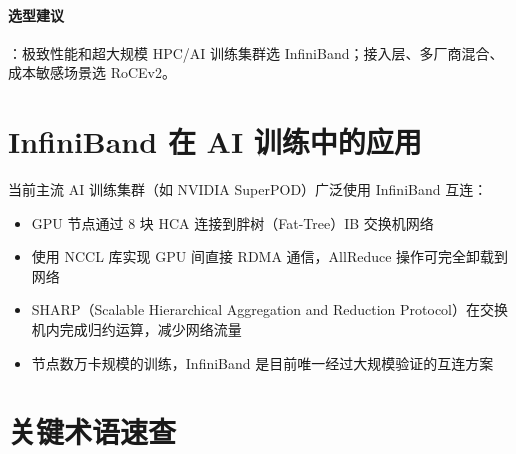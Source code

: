 \paragraph{选型建议}：极致性能和超大规模 HPC/AI 训练集群选 InfiniBand；接入层、多厂商混合、成本敏感场景选 RoCEv2。

\section{InfiniBand 在 AI 训练中的应用}

当前主流 AI 训练集群（如 NVIDIA SuperPOD）广泛使用 InfiniBand 互连：

\begin{itemize}
  \item GPU 节点通过 8 块 HCA 连接到胖树（Fat-Tree）IB 交换机网络
  \item 使用 NCCL 库实现 GPU 间直接 RDMA 通信，AllReduce 操作可完全卸载到网络
  \item SHARP（Scalable Hierarchical Aggregation and Reduction Protocol）在交换机内完成归约运算，减少网络流量
  \item 节点数万卡规模的训练，InfiniBand 是目前唯一经过大规模验证的互连方案
\end{itemize}

\section{关键术语速查}

